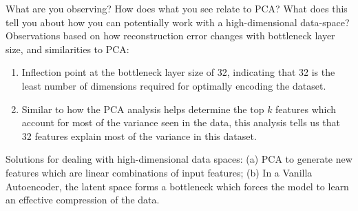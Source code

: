 \begin{enumerate}
What are you observing? How does what you see relate to PCA? What does this tell you about how you can potentially work with a high-dimensional data-space?
\newline \newline
Observations based on how reconstruction error changes with bottleneck layer size, and similarities to PCA:
\begin{enumerate}
\item Inflection point at the bottleneck layer size of 32, indicating that 32 is the least number of dimensions required for optimally encoding the dataset.
\item Similar to how the PCA analysis helps determine the top $k$ features which account for most of the variance seen in the data, this analysis tells us that 32 features explain most of the variance in this dataset.
\end{enumerate}

Solutions for dealing with high-dimensional data spaces: (a) PCA to generate new features which are linear combinations of input features; (b) In a Vanilla Autoencoder, the latent space forms a bottleneck which forces the model to learn an effective compression of the data.

\end{enumerate}
